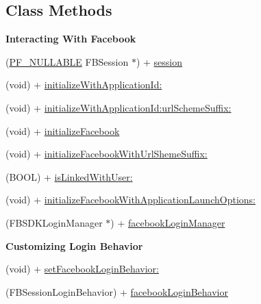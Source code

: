 \subsection*{Class Methods}
\begin{Indent}{\bf Interacting With Facebook}\par
{\em 

 

 }\begin{DoxyCompactItemize}
\item 
(\hyperlink{_p_f_nullability_8h_a528d97a96c5fb279a45c378f5657fca2}{P\+F\+\_\+\+N\+U\+L\+L\+A\+B\+L\+E} F\+B\+Session $\ast$) + \hyperlink{interface_p_f_facebook_utils_af2d526dc0c3de8f84c72e3a4ebf2d31b}{session}
\item 
(void) + \hyperlink{interface_p_f_facebook_utils_a7e76ed1e5b7b1835ce142cab99bf013e}{initialize\+With\+Application\+Id\+:}
\item 
(void) + \hyperlink{interface_p_f_facebook_utils_a68a546a99724df3fb5b123cd30d5e996}{initialize\+With\+Application\+Id\+:url\+Scheme\+Suffix\+:}
\item 
(void) + \hyperlink{interface_p_f_facebook_utils_a8845c1ab50a3a743526dc19e23837375}{initialize\+Facebook}
\item 
(void) + \hyperlink{interface_p_f_facebook_utils_a010ae5f00e0c3e8744c54f533a11191b}{initialize\+Facebook\+With\+Url\+Sheme\+Suffix\+:}
\item 
(B\+O\+O\+L) + \hyperlink{interface_p_f_facebook_utils_ac97fda6c82c6682d992e21baf6f710ac}{is\+Linked\+With\+User\+:}
\item 
(void) + \hyperlink{interface_p_f_facebook_utils_a2b15c0d6c533cf1ee2f4a1ee2401ac5c}{initialize\+Facebook\+With\+Application\+Launch\+Options\+:}
\item 
(F\+B\+S\+D\+K\+Login\+Manager $\ast$) + \hyperlink{interface_p_f_facebook_utils_ac5dd2f3a6b1742934287d739ac89dfc6}{facebook\+Login\+Manager}
\end{DoxyCompactItemize}
\end{Indent}
\begin{Indent}{\bf Customizing Login Behavior}\par
{\em 

 

 }\begin{DoxyCompactItemize}
\item 
(void) + \hyperlink{interface_p_f_facebook_utils_aa3b62d054bbf132e6ad10bc42df39c96}{set\+Facebook\+Login\+Behavior\+:}
\item 
(F\+B\+Session\+Login\+Behavior) + \hyperlink{interface_p_f_facebook_utils_aab2d58b7ca031486f9a9a460448c5036}{facebook\+Login\+Behavior}
\end{DoxyCompactItemize}
\end{Indent}
